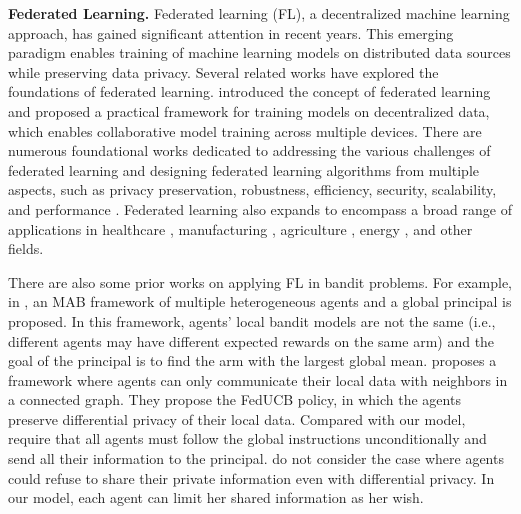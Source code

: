      \textbf{Federated Learning.}
     Federated learning (FL), a decentralized machine learning approach, has gained significant attention in recent years. This emerging paradigm enables training of machine learning models on distributed data sources while preserving data privacy. Several related works have explored the foundations of federated learning. \cite{mcmahan2017communication} introduced the concept of federated learning and proposed a practical framework for training models on decentralized data, which enables collaborative model training across multiple devices. There are numerous foundational works dedicated to addressing the various challenges of federated learning and designing federated learning algorithms from multiple aspects, such as privacy preservation, robustness, efficiency, security, scalability, and performance \cite{kamp2019efficient, pillutla2022robust, mcmahan2017communication, jeong2018communication, sattler2019robust}.  Federated learning also expands to encompass a broad range of applications in healthcare \citep{kaissis2020secure}, manufacturing \citep{qu2020blockchained}, agriculture \citep{durrant2022role}, energy \citep{saputra2019energy}, and other fields. 
     
     There are also some prior works on applying FL in bandit problems. 
     For example, in \cite{shi2021federated,shi2021federated1}, an MAB framework of multiple heterogeneous agents and a global principal is proposed. In this framework, agents' local bandit models are not the same (i.e., different agents may have different expected rewards on the same arm) and the goal of the principal is to find the arm with the largest global mean.
    \cite{zhu2021federated} proposes a framework where agents can only communicate their local data with neighbors in a connected graph.  They propose the FedUCB policy, in which the agents preserve differential privacy of their local data. 
    Compared with our model, \cite{shi2021federated,shi2021federated1} require that all agents must follow the global instructions unconditionally and send all their information to the principal. \cite{zhu2021federated} do not consider the case where agents could refuse to share their private information even with differential privacy. In our model, each agent can limit her shared information as her wish. 
    
